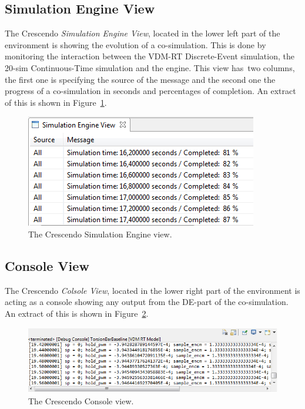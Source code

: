 \documentclass{crescendorepchap}
\begin{document}
\subsection{Simulation Engine View}

The Crescendo \emph{Simulation Engine View}, located in the lower left part of the
environment is showing the evolution of a co-simulation. This is done by
monitoring the interaction between the VDM-RT Discrete-Event simulation,
the 20-sim Continuous-Time simulation and the engine. This view has~two
columns, the first one is specifying the source of the message and the
second one the progress of a co-simulation in seconds and percentages of completion.
An extract of this is shown in Figure~\ref{fig:engineview}.

\begin{figure}[htbp]
\centering
\includegraphics[width=.6\textwidth]{images/DestecsEngineView.png}
\caption{The Crescendo Simulation Engine view.\label{fig:engineview}}
\end{figure}

\subsection{Console View}

The Crescendo \emph{Colsole View}, located in the lower right part of the
environment is acting as a console showing any output from the DE-part of
the co-simulation.
An extract of this is shown in Figure~\ref{fig:consoleview}.

\begin{figure}[htbp]
\centering
\includegraphics[width=.6\textwidth]{images/DestecsConsoleView.png}
\caption{The Crescendo Console view.\label{fig:consoleview}}
\end{figure}

\end{document}
